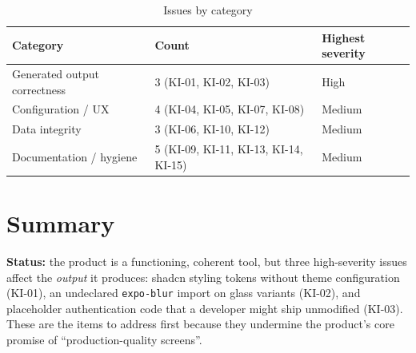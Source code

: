 \begin{table}[H]
\centering
\caption{Issues by category}
\begin{tabular}{@{}L{5cm}L{4cm}L{5cm}@{}}
\toprule
\textbf{Category} & \textbf{Count} & \textbf{Highest severity} \\
\midrule
Generated output correctness & 3 (KI-01, KI-02, KI-03) & High \\
Configuration / UX & 4 (KI-04, KI-05, KI-07, KI-08) & Medium \\
Data integrity & 3 (KI-06, KI-10, KI-12) & Medium \\
Documentation / hygiene & 5 (KI-09, KI-11, KI-13, KI-14, KI-15) & Medium \\
\bottomrule
\end{tabular}
\end{table}

\section{Summary}

\textbf{Status:} the product is a functioning, coherent tool, but three
high-severity issues affect the \emph{output} it produces: shadcn styling tokens
without theme configuration (KI-01), an undeclared \texttt{expo-blur} import on
glass variants (KI-02), and placeholder authentication code that a developer
might ship unmodified (KI-03). These are the items to address first because they
undermine the product's core promise of ``production-quality screens''.

